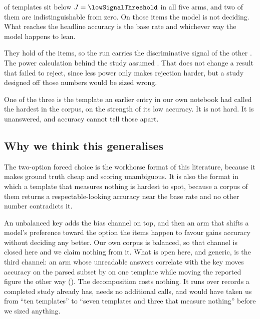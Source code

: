 \begin{table}[htbp]
\centering
\templateTable
\caption{Informedness per template, every arm. Templates marked $\dagger$ sit
below $J = \NUM{\lowSignalThreshold}$ in all five arms.}
\label{tab:templates}
\end{table}

\NUM{\lowSignalTemplates} of \NUM{\studyTemplates} templates sit below
$J = \NUM{\lowSignalThreshold}$ in all five arms, and two of them are
indistinguishable from zero. On those items the model is not deciding. What
reaches the headline accuracy is the base rate and whichever way the model
happens to lean.

They hold \NUM{\lowSignalItems} of the \NUM{\totalItems} items, so the run
carries the discriminative signal of the other \NUM{\signalItems}. The power
calculation behind the study assumed \NUM{\totalItems}. That does not change a
result that failed to reject, since less power only makes rejection harder, but
a study designed off those numbers would be sized wrong.

One of the three is the template an earlier entry in our own notebook had called
the hardest in the corpus, on the strength of its low accuracy. It is not hard.
It is unanswered, and accuracy cannot tell those apart.

\subsection{Why we think this generalises}

The two-option forced choice is the workhorse format of this literature, because
it makes ground truth cheap and scoring unambiguous. It is also the format in
which a template that measures nothing is hardest to spot, because a corpus of
them returns a respectable-looking accuracy near the base rate and no other
number contradicts it.

An unbalanced key adds the bias channel on top, and then an arm that shifts a
model's preference toward the option the items happen to favour gains accuracy
without deciding any better. Our own corpus is balanced, so that channel is
closed here and we claim nothing from it. What is open here, and generic, is the
third channel: an arm whose unreadable answers correlate with the key moves
accuracy on the parsed subset by \NUM{\gapParsedUnseenRelZeroZeroOneVendorOutageGepa}
on one template while moving the reported figure the other way
(). The decomposition costs nothing. It runs over records a completed study already
has, needs no additional calls, and would have taken us from ``ten templates''
to ``seven templates and three that measure nothing'' before we sized anything.

